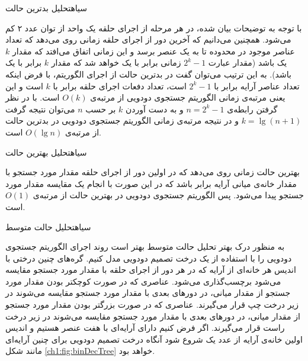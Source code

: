 {‌سیاه{تحلیل بدترین حالت}

با توجه به توضیحات بیان شده، در هر مرحله از اجرای حلقه یک واحد از توان عدد ۲ کم می‌شود. همچنین می‌دانیم که آخرین دور از اجرای حلقه زمانی روی می‌دهد که تعداد عناصر موجود در محدوده {} تا {} به یک عنصر برسد و این زمانی اتفاق می‌افتد که مقدار {$k$} یک باشد (مقدار عبارت {$2^{k}-1$} زمانی برابر با یک خواهد شد که مقدار {$k$} برابر با یک باشد). به این ترتیب می‌توان گفت در بدترین حالت از اجرای الگوریتم، با فرض اینکه تعداد عناصر آرایه برابر با {$2^{k}-1$} است، تعداد دفعات اجرای حلقه برابر با {$k$} است و این یعنی مرتبه‌ی زمانی الگوریتم جستجوی دودویی از مرتبه‌ی {$O(k)$} است. با در نظر گرفتن رابطه‌ی {$n=2^k-1$} و به دست آوردن {$k$} بر حسب {$n$} می‌توان نتیجه گرفت {$k=\lg (n+1)$} و در نتیجه مرتبه‌ی زمانی الگوریتم جستجوی دودویی در بدترین حالت از مرتبه‌ی {$O(\lg n)$} است.

‌سیاه{تحلیل بهترین حالت}

بهترین حالت زمانی روی می‌دهد که در اولین دور از اجرای حلقه مقدار مورد جستجو با مقدار خانه‌ی میانی آرایه برابر باشد که در این صورت با انجام یک مقایسه مقدار مورد جستجو پیدا می‌شود. پس الگوریتم جستجوی دودویی در بهترین حالت از مرتبه‌ی {$O(1)$} است.

‌سیاه{تحلیل حالت متوسط}

به منظور درک بهتر تحلیل حالت متوسط بهتر است روند اجرای الگوریتم جستجوی دودویی را با استفاده از یک درخت تصمیم دودویی مدل‌ کنیم. گره‌های چنین درختی با اندیس هر خانه‌ای از آرایه که در هر دور از اجرای حلقه با مقدار مورد جستجو مقایسه می‌شود برچسب‌گذاری می‌شود. عناصری که در صورت کوچکتر بودن مقدار مورد جستجو از مقدار میانی، در دورهای بعدی با مقدار مورد جستجو مقایسه می‌شوند در زیر درخت چپ قرار می‌گیرند. عناصری که در صورت بزرگتر بودن مقدار مورد جستجو از مقدار میانی، در دورهای بعدی با مقدار مورد جستجو مقایسه می‌شوند در زیر درخت راست قرار می‌گیرند. اگر فرض کنیم دارای آرایه‌ای با هفت عنصر هستیم و اندیس اولین خانه‌ی آرایه از عدد یک شروع شود آنگاه درخت تصمیم دودویی برای چنین آرایه‌ای مانند شکل {\eqref{ch1:fig:binDecTree}} خواهد بود.

}
